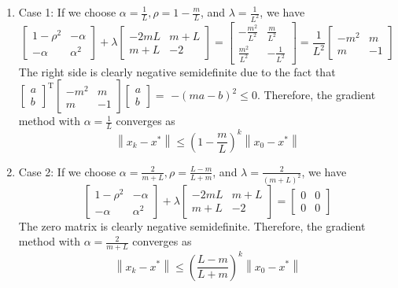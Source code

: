 \documentclass[11pt]{elegantbook}
\begin{document}
\begin{enumerate}[$\bullet$]
    \item Case 1: If we choose $\alpha=\frac{1}{L}, \rho=1-\frac{m}{L}$, and $\lambda=\frac{1}{L^{2}}$, we have
    $$
    \left[\begin{array}{cc}
    1-\rho^{2} & -\alpha \\
    -\alpha & \alpha^{2}
    \end{array}\right]+\lambda\left[\begin{array}{cc}
    -2 m L & m+L \\
    m+L & -2
    \end{array}\right]=\left[\begin{array}{cc}
    -\frac{m^{2}}{L^{2}} & \frac{m}{L^{2}} \\
    \frac{m^{2}}{L^{2}} & -\frac{1}{L^{2}}
    \end{array}\right]=\frac{1}{L^{2}}\left[\begin{array}{cc}
    -m^{2} & m \\
    m & -1
    \end{array}\right]
    $$
    The right side is clearly negative semidefinite due to the fact that $\left[\begin{array}{l}a \\ b\end{array}\right]^{\mathrm{T}}\left[\begin{array}{cc}-m^{2} & m \\ m & -1\end{array}\right]\left[\begin{array}{l}a \\ b\end{array}\right]=$ $-(m a-b)^{2} \leq 0 .$ Therefore, the gradient method with $\alpha=\frac{1}{L}$ converges as
    $$
    \left\|x_{k}-x^{*}\right\| \leq\left(1-\frac{m}{L}\right)^{k}\left\|x_{0}-x^{*}\right\|
    $$
    \item Case 2: If we choose $\alpha=\frac{2}{m+L}, \rho=\frac{L-m}{L+m}$, and $\lambda=\frac{2}{(m+L)^{2}}$, we have
    $$
    \left[\begin{array}{cc}
    1-\rho^{2} & -\alpha \\
    -\alpha & \alpha^{2}
    \end{array}\right]+\lambda\left[\begin{array}{cc}
    -2 m L & m+L \\
    m+L & -2
    \end{array}\right]=\left[\begin{array}{ll}
    0 & 0 \\
    0 & 0
    \end{array}\right]
    $$
    The zero matrix is clearly negative semidefinite. Therefore, the gradient method with $\alpha=\frac{2}{m+L}$ converges as
    $$
    \left\|x_{k}-x^{*}\right\| \leq\left(\frac{L-m}{L+m}\right)^{k}\left\|x_{0}-x^{*}\right\|
    $$
\end{enumerate}
\end{document}
